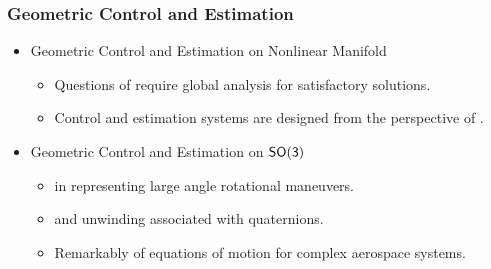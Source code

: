 \begin{frame} %
\frametitle{Geometric Control and Estimation}
\begin{itemize} 
\item Geometric Control and Estimation on Nonlinear Manifold 
	\begin{itemize} 
	\item Questions of  require global analysis for satisfactory solutions.
	\vspace*{0.1cm} 	
	\item Control and estimation systems are designed from the perspective of .
	\end{itemize} 
	\vspace*{0.3cm}
\item Geometric Control and Estimation on $\mathsf{SO(3)}$	
	\begin{itemize} 
	\item {} in representing large angle rotational maneuvers.
	\vspace*{0.1cm} 
	\item {} and unwinding associated with quaternions.
	\vspace*{0.1cm} 
	\item Remarkably  of equations of motion for complex aerospace systems.
	\end{itemize} 	
\end{itemize} 
\end{frame}   %

